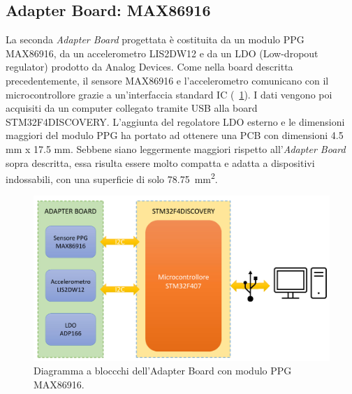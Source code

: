 \subsection{Adapter Board: MAX86916}
La seconda \textit{Adapter Board} progettata è costituita da un modulo PPG MAX86916, da un accelerometro LIS2DW12 e da un LDO (Low-dropout regulator) prodotto da Analog Devices. Come nella board descritta precedentemente, il sensore MAX86916 e l'accelerometro comunicano con il microcontrollore grazie a un'interfaccia standard IC (\Fig~\ref{fig:DiagrammaBlocchiMAX86916}). I dati vengono poi acquisiti da un computer collegato tramite USB alla board STM32F4DISCOVERY. L'aggiunta del regolatore LDO esterno e le dimensioni maggiori del modulo PPG ha portato ad ottenere una PCB con dimensioni 4.5 mm x 17.5 mm. Sebbene siano leggermente maggiori rispetto all'\textit{Adapter Board} sopra descritta, essa risulta essere molto compatta e adatta a dispositivi indossabili, con una superficie di solo \SI{78.75}{\square\milli\meter}.
\begin{figure}[h]
	\centering
	\includegraphics[width=0.6\linewidth]{ImageFiles/Hardware/DiagrammaBlocchiMAX86916}
	\caption{Diagramma a bloccchi dell'Adapter Board con modulo PPG MAX86916.}
	\label{fig:DiagrammaBlocchiMAX86916}
\end{figure}

